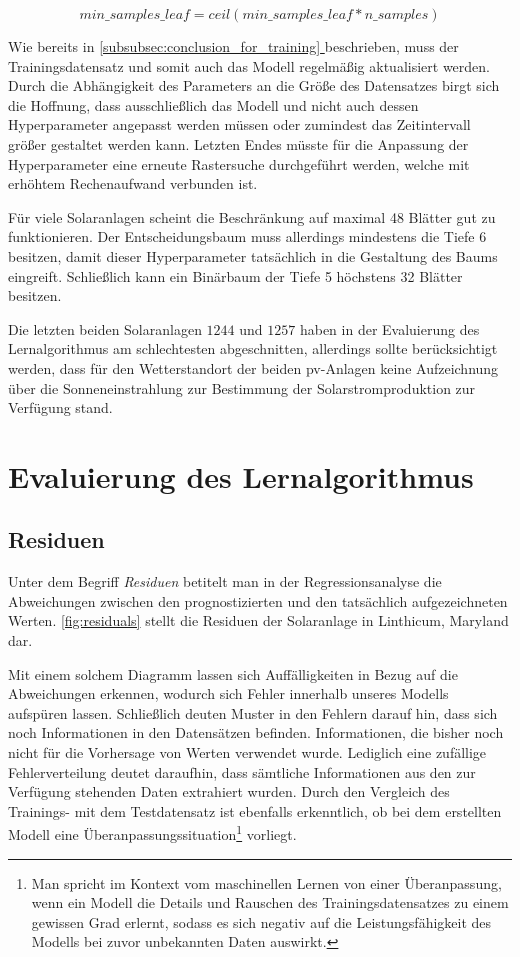 \documentclass[12pt, a4paper]{article}
\newcommand*{\fullref}[1]{\hyperref[{#1}]{\autoref*{#1} \textit{\nameref*{#1}}}}
\begin{document}
\begin{equation}
\label{eqn:min_samples_leaf}
min\_samples\_leaf=ceil(min\_samples\_leaf*n\_samples)
\end{equation}

Wie bereits in \fullref{subsubsec:conclusion_for_training} beschrieben, muss der Trainingsdatensatz und somit auch das Modell regelmäßig aktualisiert werden. Durch die Abhängigkeit des Parameters an die Größe des Datensatzes birgt sich die Hoffnung, dass ausschließlich das Modell und nicht auch dessen Hyperparameter angepasst werden müssen oder zumindest das Zeitintervall größer gestaltet werden kann. Letzten Endes müsste für die Anpassung der Hyperparameter eine erneute Rastersuche durchgeführt werden, welche mit erhöhtem Rechenaufwand verbunden ist.

Für viele Solaranlagen scheint die Beschränkung auf maximal 48 Blätter gut zu funktionieren. Der Entscheidungsbaum muss allerdings mindestens die Tiefe 6 besitzen, damit dieser Hyperparameter tatsächlich in die Gestaltung des Baums eingreift. Schließlich kann ein Binärbaum der Tiefe 5 höchstens 32 Blätter besitzen.

Die letzten beiden Solaranlagen $1244$ und $1257$ haben in der Evaluierung des Lernalgorithmus am schlechtesten abgeschnitten, allerdings sollte berücksichtigt werden, dass für den Wetterstandort der beiden \ac{pv}-Anlagen keine Aufzeichnung über die Sonneneinstrahlung zur Bestimmung der Solarstromproduktion zur Verfügung stand.

\newpage

\section{Evaluierung des Lernalgorithmus}
\label{sec:evaluation}

\subsection{Residuen}

Unter dem Begriff \textit{Residuen} betitelt man in der Regressionsanalyse die Abweichungen zwischen den prognostizierten und den tatsächlich aufgezeichneten Werten. \autoref{fig:residuals} stellt die Residuen der Solaranlage in Linthicum, Maryland dar. 

Mit einem solchem Diagramm lassen sich Auffälligkeiten in Bezug auf die Abweichungen erkennen, wodurch sich Fehler innerhalb unseres Modells aufspüren lassen. Schließlich deuten Muster in den Fehlern darauf hin, dass sich noch Informationen in den Datensätzen befinden. Informationen, die bisher noch nicht für die Vorhersage von Werten verwendet wurde. Lediglich eine zufällige Fehlerverteilung deutet daraufhin, dass sämtliche Informationen aus den zur Verfügung stehenden Daten extrahiert wurden. Durch den Vergleich des Trainings- mit dem Testdatensatz ist ebenfalls erkenntlich, ob bei dem erstellten Modell eine Überanpassungssituation\footnote{Man spricht im Kontext vom maschinellen Lernen von einer Überanpassung, wenn ein Modell die Details und Rauschen des Trainingsdatensatzes zu einem gewissen Grad erlernt, sodass es sich negativ auf die Leistungsfähigkeit des Modells bei zuvor unbekannten Daten auswirkt.} vorliegt.
\end{document}
